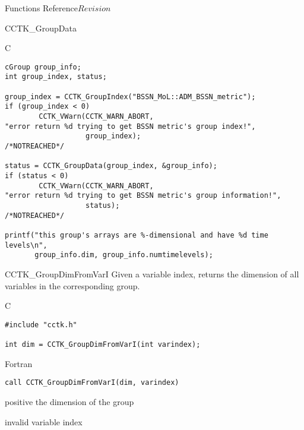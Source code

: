 \begin{cactuspart}{ Functions Reference}{}{$Revision$}
\begin{FunctionDescription}{CCTK\_GroupData}
\begin{ExampleSection}
\begin{Example}{C}
\begin{verbatim}
cGroup group_info;
int group_index, status;

group_index = CCTK_GroupIndex("BSSN_MoL::ADM_BSSN_metric");
if (group_index < 0)
        CCTK_VWarn(CCTK_WARN_ABORT,
"error return %d trying to get BSSN metric's group index!",
                   group_index);                                /*NOTREACHED*/

status = CCTK_GroupData(group_index, &group_info);
if (status < 0)
        CCTK_VWarn(CCTK_WARN_ABORT,
"error return %d trying to get BSSN metric's group information!",
                   status);                                     /*NOTREACHED*/

printf("this group's arrays are %-dimensional and have %d time levels\n",
       group_info.dim, group_info.numtimelevels);
\end{verbatim}
\end{Example}
\end{ExampleSection}
\end{FunctionDescription}


\begin{FunctionDescription}{CCTK\_GroupDimFromVarI}
\label{CCTK-GroupDimFromVarI}
Given a variable index, returns the dimension of all variables in the corresponding group.

\begin{SynopsisSection}
\begin{Synopsis}{C}
\begin{verbatim}
#include "cctk.h"

int dim = CCTK_GroupDimFromVarI(int varindex);
\end{verbatim}
\end{Synopsis}
\begin{Synopsis}{Fortran}
\begin{verbatim}
call CCTK_GroupDimFromVarI(dim, varindex)
\end{verbatim}
\end{Synopsis}
\end{SynopsisSection}

\begin{ResultSection}
\begin{Result}{positive} the dimension of the group\end{Result}
\begin{Result}{-1} invalid variable index \end{Result}
\end{ResultSection}


\end{FunctionDescription}
\end{cactuspart}
